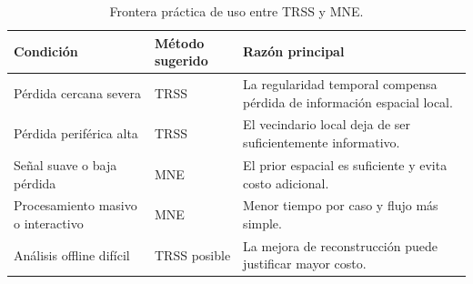 \begin{table}[htbp]
\centering
\small
\setlength{\tabcolsep}{5pt}
\caption{Frontera práctica de uso entre TRSS y MNE.}
\label{tab:ch4_decision_boundary_trss_mne}
\begin{tabular}{@{}>{\raggedright\arraybackslash}p{3.5cm}>{\raggedright\arraybackslash}p{2.8cm}>{\raggedright\arraybackslash}p{5.0cm}@{}}
\toprule
Condición & Método sugerido & Razón principal \\
\midrule
Pérdida cercana severa & TRSS & La regularidad temporal compensa pérdida de información espacial local. \\
Pérdida periférica alta & TRSS & El vecindario local deja de ser suficientemente informativo. \\
Señal suave o baja pérdida & MNE & El prior espacial es suficiente y evita costo adicional. \\
Procesamiento masivo o interactivo & MNE & Menor tiempo por caso y flujo más simple. \\
Análisis offline difícil & TRSS posible & La mejora de reconstrucción puede justificar mayor costo. \\
\bottomrule
\end{tabular}
\end{table}
